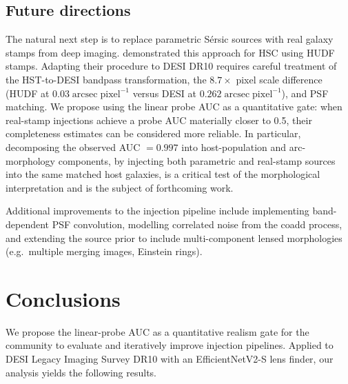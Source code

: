 \documentclass[fleqn,usenatbib]{mnras}
\begin{document}
\subsection{Future directions}

The natural next step is to replace parametric S\'{e}rsic sources with real galaxy stamps from deep imaging.  \citet{Canameras2024} demonstrated this approach for HSC using HUDF stamps.  Adapting their procedure to DESI DR10 requires careful treatment of the HST-to-DESI bandpass transformation, the $8.7\times$ pixel scale difference (HUDF at $0.03\;\mathrm{arcsec\;pixel^{-1}}$ versus DESI at $0.262\;\mathrm{arcsec\;pixel^{-1}}$), and PSF matching.  We propose using the linear probe AUC as a quantitative gate: when real-stamp injections achieve a probe AUC materially closer to 0.5, their completeness estimates can be considered more reliable.  In particular, decomposing the observed AUC $= 0.997$ into host-population and arc-morphology components, by injecting both parametric and real-stamp sources into the same matched host galaxies, is a critical test of the morphological interpretation and is the subject of forthcoming work.

Additional improvements to the injection pipeline include implementing band-dependent PSF convolution, modelling correlated noise from the coadd process, and extending the source prior to include multi-component lensed morphologies (e.g.\ multiple merging images, Einstein rings).


\section{Conclusions}

We propose the linear-probe AUC as a quantitative realism gate for the community to evaluate and iteratively improve injection pipelines.  Applied to DESI Legacy Imaging Survey DR10 with an EfficientNetV2-S lens finder, our analysis yields the following results.
\end{document}
